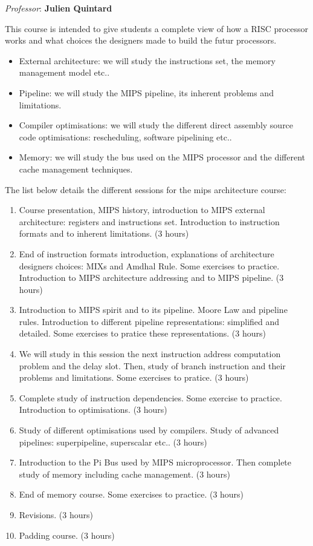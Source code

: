 \begin{multicols}{2}
\textit{Professor}: \textbf{Julien Quintard}

This course is intended to give students a complete view of how a RISC
processor works and what choices the designers made to build the futur
processors.

\begin{itemize}
  \item
    External architecture: we will study the instructions set,
    the memory management model etc..
  \item
    Pipeline: we will study the MIPS pipeline, its inherent problems
    and limitations.
  \item
    Compiler optimisations: we will study the different direct assembly
    source code optimisations: rescheduling, software pipelining etc..
  \item
    Memory: we will study the bus used on the MIPS processor and
    the different cache management techniques.
\end{itemize}

The list below details the different sessions for the mips architecture
course:

\begin{enumerate}
  \item
    Course presentation, MIPS history, introduction to MIPS external
    architecture: registers and instructions set. Introduction to
    instruction formats and to inherent limitations. (3 hours)
  \item
    End of instruction formats introduction, explanations of architecture
    designers choices: MIXs and Amdhal Rule. Some exercises to practice.
    Introduction to MIPS architecture addressing and to MIPS pipeline.
    (3 hours)
  \item
    Introduction to MIPS spirit and to its pipeline. Moore Law and
    pipeline rules. Introduction to different pipeline representations:
    simplified and detailed. Some exercises to pratice these representations.
    (3 hours)
  \item
    We will study in this session the next instruction address computation
    problem and the delay slot. Then, study of branch instruction and their
    problems and limitations. Some exercises to pratice. (3 hours)
  \item
    Complete study of instruction dependencies. Some exercise to practice.
    Introduction to optimisations. (3 hours)
  \item
    Study of different optimisations used by compilers. Study of
    advanced pipelines: superpipeline, superscalar etc.. (3 hours)
  \item
    Introduction to the Pi Bus used by MIPS microprocessor. Then complete
    study of memory including cache management. (3 hours)
  \item
    End of memory course. Some exercises to practice. (3 hours)
  \item
    Revisions. (3 hours)
  \item
    Padding course. (3 hours)
\end{enumerate}




\end{multicols}
